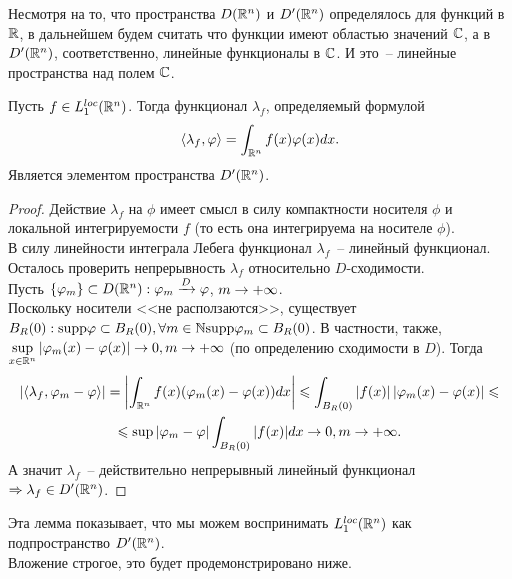 
\begin{remark}
    Несмотря на то, что пространства $D(\mathbb{R}^n)$ и $D'(\mathbb{R}^n)$ определялось для функций в $\mathbb{R}$, в дальнейшем будем считать что функции имеют областью значений $\mathbb{C}$, а в $D'(\mathbb{R}^n)$, соответственно, линейные функционалы в $\mathbb{C}$.
    И это~-- линейные пространства над полем $\mathbb{C}$.
\end{remark}
\begin{lemma}
    Пусть $f \in L_1^{loc}(\mathbb{R}^n)$.
    Тогда функционал $\lambda_f$, определяемый формулой
    \[
        \langle \lambda_f, \varphi \rangle= \int_{\mathbb{R}^n} f(x) \varphi(x) dx. \label{lambda_f_functional}
    \]
    Является элементом пространства $D'(\mathbb{R}^n)$.
\end{lemma}
\begin{proof}
    Действие $\lambda_f$ на $\phi$ имеет смысл в силу компактности носителя $\phi$ и локальной интегрируемости $f$ (то есть она интегрируема на носителе $\phi$). \\
    В силу линейности интеграла Лебега функционал $\lambda_f$~-- линейный функционал. \\
    Осталось проверить непрерывность $\lambda_f$ относительно $D$-сходимости. \\
    Пусть $\{\varphi_m\} \subset D(\mathbb{R}^n): \varphi_m \xrightarrow{D} \varphi$, $m \rightarrow +\infty$.  
    \\
    Поскольку носители <<не расползаются>>, существует $B_R(0): \text{supp} \varphi \subset B_R(0), \forall m \in \mathbb{N} \text{supp} \varphi_m \subset B_R(0)$.
    В частности, также, $\sup\limits_{x \in \mathbb{R}^n}|\varphi_m(x) - \varphi(x)| \rightarrow 0, m \rightarrow +\infty$ (по определению сходимости в $D$).
    Тогда
    \begin{multline*}
        |\langle \lambda_f, \varphi_m - \varphi \rangle | = \left|\int_{\mathbb{R}^n} f(x)(\varphi_m(x) - \varphi(x))dx\right| \leqslant \int_{B_R(0)} \left|f(x)\right|\left|\varphi_m(x) - \varphi(x)\right| \leqslant \\ \leqslant \sup |\varphi_m - \varphi| \int_{B_R(0)} |f(x)|dx \rightarrow 0, m \rightarrow +\infty.
    \end{multline*}
    А значит $\lambda_f$~-- действительно непрерывный линейный функционал $\Rightarrow \lambda_f \in D'(\mathbb{R}^n)$.
\end{proof}
\begin{note}
    Эта лемма показывает, что мы можем воспринимать $L_1^{loc}(\mathbb{R}^n)$ как подпространство $D'(\mathbb{R}^n)$. \\
    Вложение строгое, это будет продемонстрировано ниже.
\end{note}


